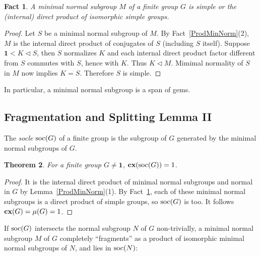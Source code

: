 \documentclass[a4paper,11pt]{amsart}
\newtheorem{theorem}{Theorem}[section]
\newtheorem{fact}[theorem]{Fact}
\theoremstyle{definition}
\newcommand{\cx}{\mbox{\bf cx}}
\newcommand{\soc}{\mbox{\rm soc}}
\newcommand{\1}{{\mathbf 1}}
\begin{document}
 
 \begin{fact}\label{MinNormSubgroup}
 A minimal normal subgroup $M$ of a finite group $G$ is simple or the (internal) direct product of isomorphic simple groups.
 \end{fact}
 \begin{proof}  Let $S$ be a minimal normal subgroup of $M$.   
 By Fact~\ref{ProdMinNorm}(2), $M$ is the internal direct product of conjugates of $S$ (including $S$ itself). 
 Suppose $\1 < K  \lhd S$, then $S$ normalizes $K$ and  each internal direct product factor different from $S$  commutes with $S$, hence with $K$.   Thus $K \lhd M$.   Mimimal normality of $S$  in $M$ now implies $K=S$. Therefore $S$ is simple.
 \end{proof}
 
 In particular, a minimal normal subgroup is a span of gems. 
 

\subsection{Fragmentation and Splitting Lemma II}\label{FragSplitII}
 
The {\em socle} $\soc(G)$ of a finite group is the subgroup of $G$ generated by the minimal normal subgroups of $G$.  

\begin{theorem} For a finite group $G\neq \1$, $\cx(\soc(G))=1$.  \end{theorem}
\begin{proof}
It is the internal direct product of minimal normal subgroups  and normal in $G$ by Lemma~\ref{ProdMinNorm}(1). By Fact~\ref{MinNormSubgroup}, each
of these minimal normal subgroups is a direct product of simple groups, so $\soc(G)$ is too. It follows $\cx(G)=\mu(G)=1$.
\end{proof}


If $\soc(G)$ intersects the normal subgroup $N$ of $G$ non-trivially,  a minimal normal subgroup $M$ of $G$  completely ``fragments'' as a product of isomorphic minimal normal subgroups of $N$, and lies in $\soc(N)$: 
\end{document}
